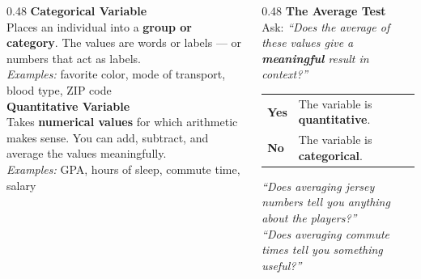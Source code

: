 \documentclass[aspectratio=169, 11pt]{beamer}
\begin{document}
{
\begin{frame}[t, plain]
  \hspace{0.4cm}%
  \begin{minipage}{0.93\textwidth}
    \vspace{0.5cm}
    \begin{columns}[T]

      \begin{column}{0.48\textwidth}
        \small
        \textbf{\color{greenacc}Categorical Variable}\\[4pt]
        Places an individual into a \textbf{group or category}.
        The values are words or labels --- or numbers that act as labels.\\[6pt]
        \textit{Examples:} favorite color, mode of transport,
        blood type, ZIP code\\[10pt]

        \textbf{\color{navy}Quantitative Variable}\\[4pt]
        Takes \textbf{numerical values} for which arithmetic makes sense.
        You can add, subtract, and average the values meaningfully.\\[6pt]
        \textit{Examples:} GPA, hours of sleep, commute time, salary
      \end{column}

      \begin{column}{0.48\textwidth}
        \small
        \textbf{\color{goldacc}The Average Test}\\[4pt]
        Ask: \textit{``Does the average of these values give a
        \textbf{meaningful} result in context?''}

        \vspace{8pt}
        \setlength{\tabcolsep}{6pt}
        \renewcommand{\arraystretch}{1.6}
        \begin{tabular}{@{} >{\bfseries}p{} p{} @{}}
          \rowcolor{greenbg}
          Yes & The variable is \textbf{quantitative}. \\
          \rowcolor{redbg}
          No  & The variable is \textbf{categorical}. \\
        \end{tabular}

        \vspace{10pt}
        \footnotesize\color{slate}
        \textit{``Does averaging jersey numbers tell you anything about
        the players?''}\\[4pt]
        \textit{``Does averaging commute times tell you something useful?''}
      \end{column}

    \end{columns}
  \end{minipage}
\end{frame}
}
\end{document}
